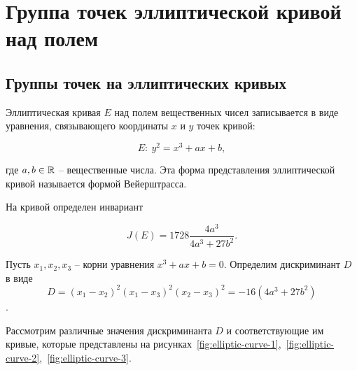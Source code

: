 \section{Группа точек эллиптической кривой над полем}

\subsection{Группы точек на эллиптических кривых}

Эллиптическая кривая $E$ над полем вещественных чисел записывается в виде уравнения, связывающего координаты $x$ и $y$ точек кривой:

\begin{equation}
    E: ~ y^{2} = x^{3} + ax + b,
    \label{Wer}
\end{equation}

где $a,b \in \mathbb{R}$ -- вещественные числа. Эта форма представления эллиптической кривой называется формой Вейерштрасса.

На кривой определен инвариант

\begin{equation}
    J(E)=1728\frac{4a^{3} }{4a^{3} +27b^{2} }.
\end{equation}

Пусть $x_{1} ,x_{2} ,x_{3} $ -- корни уравнения $x^3 + a x + b = 0$. Определим дискриминант $D$ в виде
    \[ D =(x_1 - x_2)^2 (x_1 - x_3)^2 (x_2 - x_3)^2 = - 16(4 a^3 + 27 b^2) \].

Рассмотрим различные значения дискриминанта $D$ и соответствующие им кривые, которые представлены на рисунках~\ref{fig:elliptic-curve-1},~\ref{fig:elliptic-curve-2},~\ref{fig:elliptic-curve-3}.


